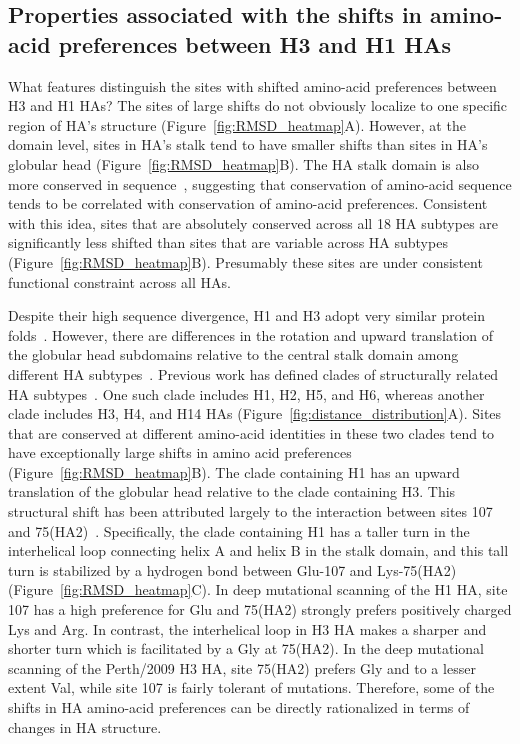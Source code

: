 \documentclass[9pt,twocolumn,twoside]{pnas-new}
\begin{document}
\subsection*{Properties associated with the shifts in amino-acid preferences between H3 and H1 HAs}
What features distinguish the sites with shifted amino-acid preferences between H3 and H1 HAs?
The sites of large shifts do not obviously localize to one specific region of HA's structure (Figure~\ref{fig:RMSD_heatmap}A).
However, at the domain level, sites in HA's stalk tend to have smaller shifts than sites in HA's globular head (Figure~\ref{fig:RMSD_heatmap}B). 
The HA stalk domain is also more conserved in sequence~\cite{nobusawa1991comparison,hai2012influenza,mallajosyula2014influenza}, suggesting that conservation of amino-acid sequence tends to be correlated with conservation of amino-acid preferences.
Consistent with this idea, sites that are absolutely conserved across all 18 HA subtypes are significantly less shifted than sites that are variable across HA subtypes (Figure~\ref{fig:RMSD_heatmap}B).
Presumably these sites are under consistent functional constraint across all HAs.

Despite their high sequence divergence, H1 and H3 adopt very similar protein folds~\cite{ha2002h5,russell2004h1}.
However, there are differences in the rotation and upward translation of the globular head subdomains relative to the central stalk domain among different HA subtypes~\cite{ha2002h5,russell2004h1}.
Previous work has defined clades of structurally related HA subtypes~\cite{ha2002h5,russell2004h1}.
One such clade includes H1, H2, H5, and H6, whereas another clade includes H3, H4, and H14 HAs (Figure~\ref{fig:distance_distribution}A).
Sites that are conserved at different amino-acid identities in these two clades tend to have exceptionally large shifts in amino acid preferences (Figure~\ref{fig:RMSD_heatmap}B).
The clade containing H1 has an upward translation of the globular head relative to the clade containing H3.
This structural shift has been attributed largely to the interaction between sites 107 and 75(HA2)~\cite{ha2002h5,russell2004h1}.
Specifically, the clade containing H1 has a taller turn in the interhelical loop connecting helix A and helix B in the stalk domain, and this tall turn is stabilized by a hydrogen bond between Glu-107 and Lys-75(HA2) (Figure~\ref{fig:RMSD_heatmap}C).
In deep mutational scanning of the H1 HA, site 107 has a high preference for Glu and 75(HA2) strongly prefers positively charged Lys and Arg.
In contrast, the interhelical loop in H3 HA makes a sharper and shorter turn which is facilitated by a Gly at 75(HA2).
In the deep mutational scanning of the Perth/2009 H3 HA, site 75(HA2) prefers Gly and to a lesser extent Val, while site 107 is fairly tolerant of mutations.
Therefore, some of the shifts in HA amino-acid preferences can be directly rationalized in terms of changes in HA structure.
\end{document}

